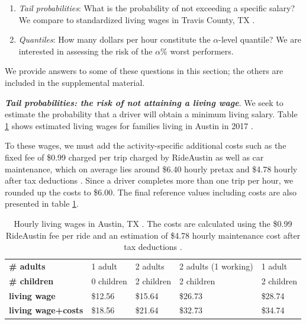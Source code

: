 \documentclass[11pt]{article}
\begin{document}
 \begin{enumerate}
     \item \textit{Tail probabilities}: What is the probability of not exceeding a specific salary? We compare to standardized living wages in Travis County, TX \citep{nadeau-2017}. 
     \item \textit{Quantiles}: How many dollars per hour constitute the $\alpha$-level quantile? We are interested in assessing the risk of the $\alpha$\% worst performers.
 \end{enumerate}
 
 We provide answers to some of these questions in this section; the others are included in the supplemental material. 

{\bfseries \itshape Tail probabilities: the risk of not attaining a living wage}. We seek to estimate the probability that a driver will obtain a minimum living salary. Table \ref{tbl:livingwages} shows estimated living wages for families living in Austin in 2017 \citep{nadeau-2017}. 

To these wages, we must add the activity-specific additional costs such as the fixed fee of \$0.99 charged per trip charged by RideAustin as well as car maintenance, which on average lies around \$6.40 hourly pretax and \$4.78 hourly after tax deductions \citep{mishel-2018} \citep{hall-etal-2016}. Since a driver completes more than one trip per hour, we rounded up the costs to \$6.00. The final reference values including costs are also presented in table \ref{tbl:livingwages}.

\begin{table}[htb]
    \centering
    \small
    \begin{tabular}{l|l|l|l|l}
        \textbf{\# adults} & 1 adult &  2 adults & 2 adults (1 working) & 1 adult  \\ %
        \textbf{\# children} & 0 children  &   2 children & 2 children & 2 children  \\
       \hline
        \textbf{living wage} & \$12.56  & \$15.64 & \$26.73 & \$28.74  \\ 
        \textbf{living wage+costs} & \$18.56  & \$21.64 & \$32.73 & \$34.74  \\ 
    \end{tabular}
    \caption{Hourly living wages in Austin, TX \citep{nadeau-2017}. The costs are calculated using the \$0.99 RideAustin fee per ride and an estimation of \$4.78 hourly maintenance cost after tax deductions \citep{mishel-2018}.}
    \label{tbl:livingwages}
\end{table}
\end{document}
